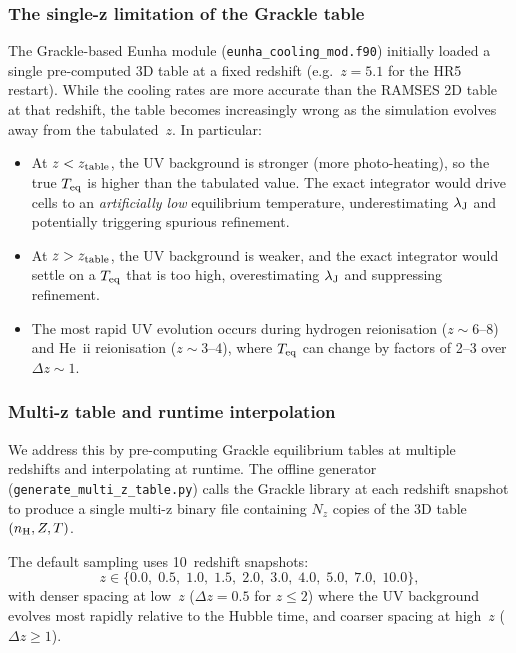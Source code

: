 \documentclass[fleqn,usenatbib]{mnras}
\newcommand{\lJ}{\lambda_{\rm J}}
\newcommand{\code}[1]{\texttt{#1}}
\begin{document}
\subsubsection{The single-z limitation of the Grackle table}

The Grackle-based Eunha module (\code{eunha\_cooling\_mod.f90})
initially loaded a single pre-computed 3D table at a fixed redshift
(e.g.\ $z = 5.1$ for the HR5 restart).  While the cooling rates are
more accurate than the RAMSES 2D table at that redshift, the table
becomes increasingly wrong as the simulation evolves away from the
tabulated~$z$.  In particular:

\begin{itemize}
  \item At $z < z_{\rm table}$, the UV background is stronger (more
    photo-heating), so the true $T_{\rm eq}$ is higher than the
    tabulated value.  The exact integrator would drive cells to an
    \emph{artificially low} equilibrium temperature, underestimating
    $\lJ$ and potentially triggering spurious refinement.
  \item At $z > z_{\rm table}$, the UV background is weaker, and the
    exact integrator would settle on a $T_{\rm eq}$ that is too high,
    overestimating $\lJ$ and suppressing refinement.
  \item The most rapid UV evolution occurs during hydrogen reionisation
    ($z \sim 6$--$8$) and He~{\sc ii} reionisation ($z \sim 3$--$4$),
    where $T_{\rm eq}$ can change by factors of 2--3 over $\Delta z
    \sim 1$.
\end{itemize}

\subsubsection{Multi-z table and runtime interpolation}

We address this by pre-computing Grackle equilibrium tables at multiple
redshifts and interpolating at runtime.  The offline generator
(\code{generate\_multi\_z\_table.py}) calls the Grackle library at
each redshift snapshot to produce a single multi-z binary file
containing $N_z$ copies of the 3D table $(n_{\rm H}, Z, T)$.

The default sampling uses 10~redshift snapshots:
\begin{equation}
  z \in \{0.0,\; 0.5,\; 1.0,\; 1.5,\; 2.0,\; 3.0,\; 4.0,\; 5.0,\;
  7.0,\; 10.0\},
  \label{eq:z_grid}
\end{equation}
with denser spacing at low~$z$ ($\Delta z = 0.5$ for $z \le 2$) where
the UV background evolves most rapidly relative to the Hubble time, and
coarser spacing at high~$z$ ($\Delta z \ge 1$).
\end{document}
